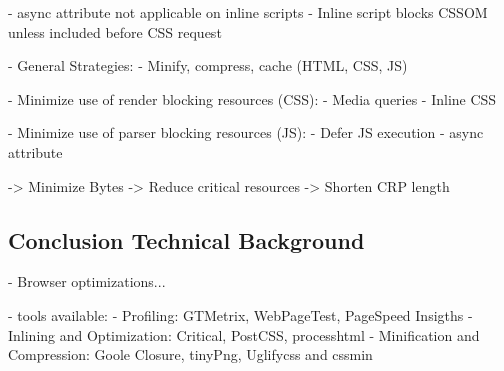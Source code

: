 	- async attribute not applicable on inline scripts
	- Inline script blocks CSSOM unless included before CSS request


- General Strategies:
	- Minify, compress, cache (HTML, CSS, JS)

	- Minimize use of render blocking resources (CSS):
		- Media queries
		- Inline CSS

	- Minimize use of parser blocking resources (JS):
		- Defer JS execution
		- async attribute


	-> Minimize Bytes
	-> Reduce critical resources
	-> Shorten CRP length



























\subsection{Conclusion Technical Background}







- Browser optimizations...

- tools available:
- Profiling: GTMetrix, WebPageTest, PageSpeed Insigths
- Inlining and Optimization: Critical, PostCSS, processhtml
- Minification and Compression: Goole Closure, tinyPng, Uglifycss and cssmin









